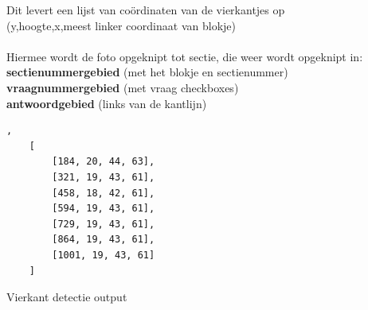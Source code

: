 \documentclass[12pt]{article}
\begin{document}
\begin{multicols}{2}
   Dit levert een lijst van coördinaten van de vierkantjes op\\(y,hoogte,x,meest linker coordinaat van blokje)\\
   \\
   Hiermee wordt de foto opgeknipt tot sectie, die weer wordt opgeknipt in:\\
   \textbf{sectienummergebied} (met het blokje en sectienummer) \\
   \textbf{vraagnummergebied} (met vraag checkboxes) \\
   \textbf{antwoordgebied} (links van de kantlijn)
   
    \begin{listing}[H]
    \begin{verbatim},
    [
        [184, 20, 44, 63], 
        [321, 19, 43, 61], 
        [458, 18, 42, 61], 
        [594, 19, 43, 61], 
        [729, 19, 43, 61], 
        [864, 19, 43, 61], 
        [1001, 19, 43, 61]
    ]
    \end{verbatim}
    \caption{Vierkant detectie output} 
    \label{json-example}
    \end{listing}

\end{multicols}
\end{document}
